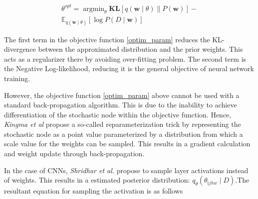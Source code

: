 \documentclass[10pt,twocolumn,letterpaper]{article}
\begin{document}
\begin{equation}
\label{optim_param}
    \begin{aligned}
    \theta^{opt} =\operatorname{argmin}_{\theta} \mathbf{K L}[q(\mathbf{w} \mid \theta) \| P(\mathbf{w})]- \\ \mathbb{E}_{q(\mathbf{w} \mid \theta)}[\log P(D \mid \mathbf{w})]
    \end{aligned}
\end{equation}

        

The first term in the objective function \ref{optim_param} reduces the KL-divergence between the approximated distribution and the prior weights. This acts as a regularizer there by avoiding over-fitting problem. The second term is the Negative Log-likelihood, reducing it is the general objective of neural network training. 

However, the objective function \ref{optim_param} above cannot be used with a standard back-propagation algorithm. This is due to the inability to achieve differentiation of the stochastic node within the objective function. Hence, \textit{Kingma et al} \cite{Kingma2015} propose a so-called reparameterization trick by representing the stochastic node as a point value parameterized by a distribution from which a scale value for the weights can be sampled. This results in a gradient calculation and weight update through back-propagation. 

In the case of CNNs, \textit{Shridhar et al.} propose to sample layer activations instead of weights. This results in a estimated posterior distribution: $q_{\theta}\left(\theta_{\mathrm{i} j h w} \mid D\right)$.The resultant equation for sampling the activation is as follows
        
\end{document}
